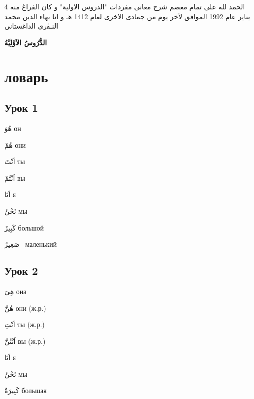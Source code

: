 \documentclass[a5paper]{article}
\newcommand\textstyleDropCaps[1]{#1}
\newcommand\textstyleCaptioncharacters[1]{#1}
\begin{document}
الحمد لله على تمام معصم شرح معانى مفردات "الدروس الاولية" و كان الفراغ منه 4 يناير عام 1992 الموافق لآخر يوم من جمادى الاخرى لعام 1412 هـ و انا بهاء الدين محمد النـﭭرى الداغستانى


{\centering
\textbf{الدُّرُوسُ الاَوَّلِيَّةُ}
\par}

\section{ловарь‎}
\subsection[Урок 1‎]{\textstyleDropCaps{Урок 1‎}}
\textstyleCaptioncharacters{هُوَ }\textstyleDropCaps{он‎}

\textstyleCaptioncharacters{هُمْ }\textstyleDropCaps{они‎}

\textstyleCaptioncharacters{اَنْتَ }\textstyleDropCaps{ты ‎}

\textstyleCaptioncharacters{اَنْتُمْ }\textstyleDropCaps{вы ‎}

\textstyleCaptioncharacters{اَنَا }\textstyleDropCaps{я‎}

\textstyleCaptioncharacters{نَحْنُ }\textstyleDropCaps{мы‎}

\textstyleCaptioncharacters{كَبِيرٌ }\textstyleDropCaps{большой‎}

\textstyleCaptioncharacters{صَغِيرٌ \ }\textstyleDropCaps{маленький‎}

\subsection[Урок 2‎]{\textstyleDropCaps{Урок 2‎}}
\textstyleCaptioncharacters{هِىَ }\textstyleDropCaps{она‎}

\textstyleCaptioncharacters{هُنَّ }\textstyleDropCaps{они (ж.р.)‎}

\textstyleCaptioncharacters{اَنْتِ }\textstyleDropCaps{ты (ж.р.)‎}

\textstyleCaptioncharacters{اَنْتُنَّ }\textstyleDropCaps{вы (ж.р.)‎}

\textstyleCaptioncharacters{اَنَا }\textstyleDropCaps{я‎}

\textstyleCaptioncharacters{نَحْنُ }\textstyleDropCaps{мы‎}

\textstyleCaptioncharacters{كَبِيرَةٌ }\textstyleDropCaps{большая‎}
\end{document}
